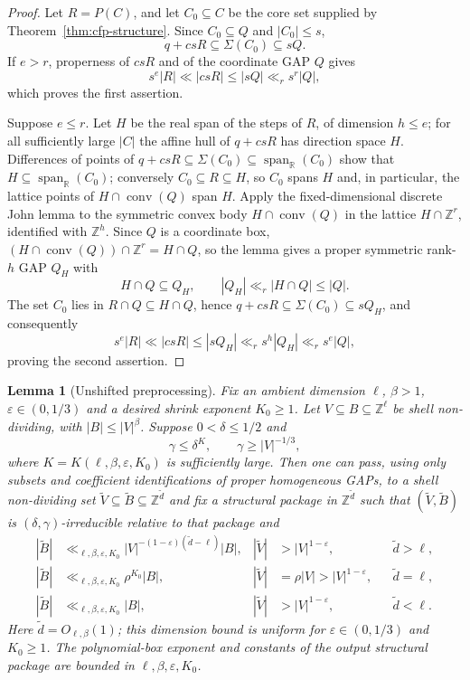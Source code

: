 \documentclass[11pt,reqno]{amsart}
\newtheorem{lemma}[theorem]{Lemma}
\theoremstyle{definition}
\theoremstyle{remark}
\newcommand{\Z}{\mathbb Z}
\newcommand{\R}{\mathbb R}
\newcommand{\eps}{\varepsilon}
\newcommand{\Span}{\operatorname{span}}
\newcommand{\conv}{\operatorname{conv}}
\newcommand{\SigmaSet}{\Sigma}
\begin{document}
\begin{proof}
Let $R=P(C)$, and let $C_0\subseteq C$ be the core set supplied by Theorem~\ref{thm:cfp-structure}.  Since $C_0\subseteq Q$ and $|C_0|\le s$,
\[
 q+csR\subseteq\SigmaSet(C_0)\subseteq sQ.
\]
If $e>r$, properness of $csR$ and of the coordinate GAP $Q$ gives
\[
 s^e|R|\ll |csR|\le |sQ|\ll_r s^r|Q|,
\]
which proves the first assertion.

Suppose $e\le r$.  Let $H$ be the real span of the steps of $R$, of
dimension $h\le e$; for all sufficiently large $|C|$ the affine hull of
$q+csR$ has direction space $H$.  Differences of points of
$q+csR\subseteq\SigmaSet(C_0)\subseteq\Span_{\R}(C_0)$ show that
$H\subseteq\Span_{\R}(C_0)$; conversely $C_0\subseteq R\subseteq H$, so
$C_0$ spans $H$ and, in particular, the lattice points of
$H\cap\conv(Q)$ span $H$.  Apply the fixed-dimensional discrete John
lemma \cite[Lemma~7]{PhamZakharov} to the symmetric convex body
$H\cap\conv(Q)$ in the lattice $H\cap\Z^r$, identified with $\Z^h$.
Since $Q$ is a coordinate box,
$(H\cap\conv(Q))\cap\Z^r=H\cap Q$, so the lemma gives a proper symmetric
rank-$h$ GAP $Q_H$ with
\[
 H\cap Q\subseteq Q_H,
 \qquad
 |Q_H|\ll_r |H\cap Q|\le |Q|.
\]
The set $C_0$ lies in $R\cap Q\subseteq H\cap Q$, hence
$q+csR\subseteq\SigmaSet(C_0)\subseteq sQ_H$, and consequently
\[
 s^e|R|\ll |csR|
 \le |sQ_H|
 \ll_r s^h|Q_H|
 \ll_r s^e|Q|,
\]
proving the second assertion.
\end{proof}

\begin{lemma}[Unshifted preprocessing]
\label{lem:unshifted-preprocessing}
Fix an ambient dimension $\ell$, $\beta>1$, $\eps\in(0,1/3)$ and a
desired shrink exponent $K_0\ge1$.  Let
$V\subseteq B\subseteq\Z^\ell$ be shell non-dividing, with
$|B|\le |V|^\beta$.  Suppose $0<\delta\le1/2$ and
\[
 \gamma\le\delta^K,
 \qquad
 \gamma\ge |V|^{-1/3},
\]
where $K=K(\ell,\beta,\eps,K_0)$ is sufficiently large.  Then one can
pass, using only subsets and coefficient identifications of proper
homogeneous GAPs, to a shell non-dividing set
$\widetilde V\subseteq\widetilde B\subseteq\Z^{\widetilde d}$ and
fix a structural package in $\Z^{\widetilde d}$ such that
$(\widetilde V,\widetilde B)$ is $(\delta,\gamma)$-irreducible relative
to that package and
\begin{align*}
 |\widetilde B|&\ll_{\ell,\beta,\eps,K_0} |V|^{-(1-\eps)(\widetilde d-\ell)}|B|,
 &|\widetilde V|&>|V|^{1-\eps},&&\widetilde d>\ell,\\
 |\widetilde B|&\ll_{\ell,\beta,\eps,K_0} \rho^{K_0}|B|,
 &|\widetilde V|&=\rho|V|>|V|^{1-\eps},&&\widetilde d=\ell,\\
 |\widetilde B|&\ll_{\ell,\beta,\eps,K_0}|B|,
 &|\widetilde V|&>|V|^{1-\eps},&&\widetilde d<\ell.
\end{align*}
Here $\widetilde d=O_{\ell,\beta}(1)$; this dimension bound is uniform
for $\eps\in(0,1/3)$ and $K_0\ge1$.  The polynomial-box exponent and
constants of the output structural package are bounded in
$\ell,\beta,\eps,K_0$.
\end{lemma}
\end{document}
